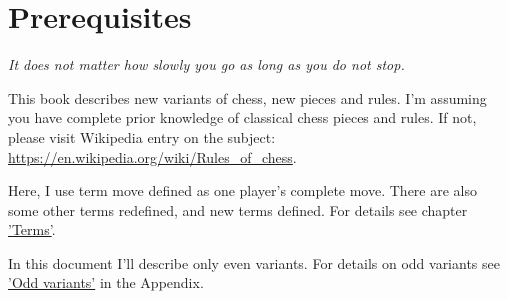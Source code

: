 

\chapter*{Prerequisites}

\begin{flushright}
\parbox{0.7\textwidth}{
\emph{It does not matter how slowly you go as long as you do not stop. \\
 } }
\end{flushright}

\noindent
This book describes new variants of chess, new pieces and rules. I'm assuming you have complete prior
knowledge of classical chess pieces and rules. If not, please visit Wikipedia entry on the subject: \\
\href{https://en.wikipedia.org/wiki/Rules\_of\_chess}{https://en.wikipedia.org/wiki/Rules\_of\_chess}.

Here, I use term move defined as one player's complete move. There are also some other terms redefined,
and new terms defined. For details see chapter \hyperref[ch:Terms]{'Terms'}.

In this document I'll describe only even variants. For details on odd variants see
\hyperref[sec:Appendix/Odd variants]{'Odd variants'} in the Appendix.

\clearpage %

